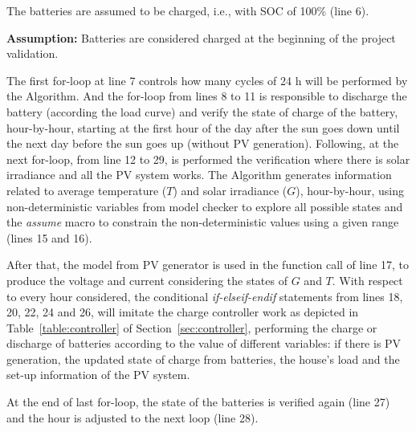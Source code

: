 The batteries are assumed to be charged, i.e., with SOC of 100\% (line 6).

\textbf{Assumption:} Batteries are considered charged at the beginning of the project validation.

The first for-loop at line 7 controls how many cycles of 24 h will be performed by the Algorithm.  And the for-loop from lines 8 to 11 is responsible to discharge the battery (according the load curve) and verify the state of charge of the battery, hour-by-hour, starting at the first hour of the day after the sun goes down until the next day before the sun goes up (without PV generation). Following, at the next for-loop, from line 12 to 29, is performed the verification where there is solar irradiance and all the PV system works. The Algorithm generates information related to average temperature ($T$) and solar irradiance ($G$), hour-by-hour, using non-deterministic variables from model checker to explore all possible states and the \textit{assume} macro to constrain the non-deterministic values using a given range (lines 15 and 16). 

After that, the model from PV generator is used in the function call of line 17, to produce the voltage and current considering the states of $G$ and $T$. With respect to every hour considered, the conditional \textit{if-elseif-endif} statements from lines 18, 20, 22, 24 and 26, will imitate the charge controller work as depicted in Table~\ref{table:controller} of Section~\ref{sec:controller}, performing the charge or discharge of batteries according to the value of different variables: if there is PV generation, the updated state of charge from batteries, the house's load and the set-up information of the PV system.

At the end of last for-loop, the state of the batteries is verified again (line 27) and the hour is adjusted to the next loop (line 28).

